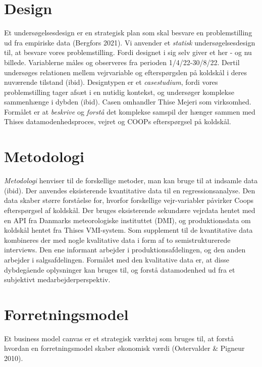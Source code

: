 \documentclass[
  12pt,
  a4paper,
  DIV=11,
  numbers=noendperiod]{scrartcl}
\begin{document}
\hypertarget{design}{%
\section{Design}\label{design}}

Et undersøgelsesdesign er en strategisk plan som skal besvare en
problemstilling ud fra empiriske data (Bergfors 2021). Vi anvender et
\emph{statisk} undersøgelsesdesign til, at besvare vores
problemstilling. Fordi designet i sig selv giver et her - og nu billede.
Variablerne måles og observeres fra perioden 1/4/22-30/8/22. Dertil
undersøges relationen mellem vejrvariable og efterspørgslen på koldskål
i deres nuværende tilstand (ibid). Designtypen er et \emph{casestudium},
fordi vores problemstilling tager afsæt i en nutidig kontekst, og
undersøger komplekse sammenhænge i dybden (ibid). Casen omhandler Thise
Mejeri som virksomhed. Formålet er at \emph{beskrive} og \emph{forstå}
det komplekse samspil der hænger sammen med Thises datamodenhedsproces,
vejret og COOPs efterspørgsel på koldskål.

\hypertarget{metodologi}{%
\section{Metodologi}\label{metodologi}}

\emph{Metodologi} henviser til de forskellige metoder, man kan bruge til
at indsamle data (ibid). Der anvendes eksisterende kvantitative data til
en regressionsanalyse. Den data skaber større forståelse for, hvorfor
forskellige vejr-variabler påvirker Coops efterspørgsel af koldskål. Der
bruges eksisterende sekundære vejrdata hentet med en API fra Danmarks
meteorologiske instituttet (DMI), og produktionsdata om koldskål hentet
fra Thises VMI-system. Som supplement til de kvantitative data
kombineres der med nogle kvalitative data i form af to semistrukturerede
interviews. Den ene informant arbejder i produktionsafdelingen, og den
anden arbejder i salgsafdelingen. Formålet med den kvalitative data er,
at disse dybdegående oplysninger kan bruges til, og forstå datamodenhed
ud fra et subjektivt medarbejderperspektiv.

\hypertarget{forretningsmodel}{%
\section{Forretningsmodel}\label{forretningsmodel}}

Et business model canvas er et strategisk værktøj som bruges til, at
forstå hvordan en forretningsmodel skaber økonomisk værdi (Ostervalder
\& Pigneur 2010).
\end{document}
